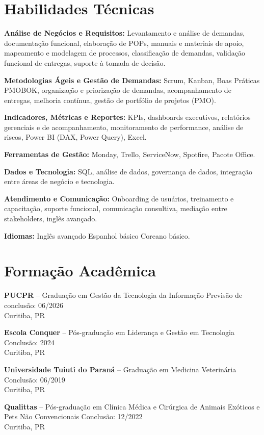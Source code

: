 \documentclass[11pt,a4paper]{article}
\begin{document}
\section*{Habilidades Técnicas}

\textbf{Análise de Negócios e Requisitos:} Levantamento e análise de demandas, documentação funcional, elaboração de POPs, manuais e materiais de apoio, mapeamento e modelagem de processos, classificação de demandas, validação funcional de entregas, suporte à tomada de decisão.

\textbf{Metodologias Ágeis e Gestão de Demandas:} Scrum, Kanban, Boas Práticas PMOBOK, organização e priorização de demandas, acompanhamento de entregas, melhoria contínua, gestão de portfólio de projetos (PMO).

\textbf{Indicadores, Métricas e Reportes:} KPIs, dashboards executivos, relatórios gerenciais e de acompanhamento, monitoramento de performance, análise de riscos, Power BI (DAX, Power Query), Excel.

\textbf{Ferramentas de Gestão:} Monday, Trello, ServiceNow, Spotfire, Pacote Office.

\textbf{Dados e Tecnologia:} SQL, análise de dados, governança de dados, integração entre áreas de negócio e tecnologia.

\textbf{Atendimento e Comunicação:} Onboarding de usuários, treinamento e capacitação, suporte funcional, comunicação consultiva, mediação entre stakeholders, inglês avançado.

\textbf{Idiomas:} Inglês avançado \textbullet{} Espanhol básico \textbullet{} Coreano básico.

\section*{Formação Acadêmica}

\textbf{PUCPR} -- Graduação em Gestão da Tecnologia da Informação \hfill Previsão de conclusão: 06/2026\\
Curitiba, PR

\textbf{Escola Conquer} -- Pós-graduação em Liderança e Gestão em Tecnologia \hfill Conclusão: 2024\\
Curitiba, PR

\textbf{Universidade Tuiuti do Paraná} -- Graduação em Medicina Veterinária \hfill Conclusão: 06/2019\\
Curitiba, PR

\textbf{Qualittas} -- Pós-graduação em Clínica Médica e Cirúrgica de Animais Exóticos e Pets Não Convencionais \hfill Conclusão: 12/2022\\
Curitiba, PR
\end{document}
